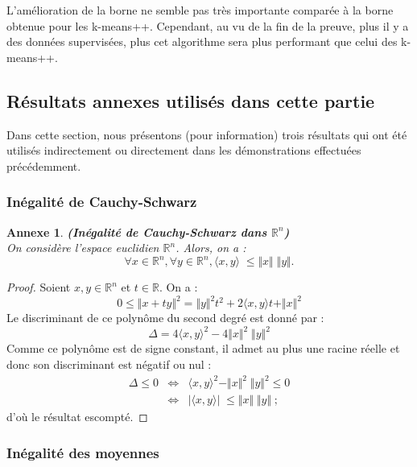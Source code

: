 \documentclass[12pt,a4paper]{book}
\newtheorem{annexe}{Annexe}
\newcommand{\R}{\mathbb{R}}
\newcommand{\1}{\mathds{1}}
\begin{document}
	L'amélioration de la borne ne semble pas très importante comparée à la borne obtenue pour les k-means++. Cependant, au vu de la fin de la preuve, plus il y a des données supervisées, plus cet algorithme sera plus performant que celui des k-means++.
	

\subsection{Résultats annexes utilisés dans cette partie}

Dans cette section, nous présentons (pour information) trois résultats qui ont été utilisés indirectement ou directement dans les démonstrations effectuées précédemment.

\subsubsection{Inégalité de Cauchy-Schwarz}
	
	\begin{annexe} \label{cauchy-schwarz}
		\textbf{(Inégalité de Cauchy-Schwarz dans $\R^n$)}\\
		On considère l'espace euclidien $\R^n$. Alors, on a : 
		$$
			\forall x \in \R^n, \forall y \in \R^n, \langle x,y \rangle \; \leq \Vert x \Vert \; \Vert y \Vert.
		$$
	\end{annexe}
	
	\begin{proof}
		Soient $x,y \in \R^n$ et $t \in \R$. On a :
		$$
			0 \leq \Vert x+ty \Vert^2 = \Vert y \Vert^2 t^2 + 2 \langle x,y \rangle t + \Vert x \Vert^2
		$$
		Le discriminant de ce polynôme du second degré est donné par :
		$$
			\Delta = 4 \langle x,y \rangle^2 - 4 \Vert x \Vert^2 \; \Vert y \Vert^2
		$$
		Comme ce polynôme est de signe constant, il admet au plus une racine réelle et donc son discriminant est négatif ou nul : 
		\begin{eqnarray*}
		 \Delta \leq 0 & \Leftrightarrow & \langle x,y \rangle^2 - \Vert x \Vert^2 \; \Vert y \Vert^2 \leq 0 \\
		 & \Leftrightarrow & \vert \langle x,y \rangle \vert \; \leq \Vert x \Vert \; \Vert y \Vert \; ;
		\end{eqnarray*}
		 d'où le résultat escompté.
	\end{proof}	
	
\subsubsection{Inégalité des moyennes}
\end{document}
